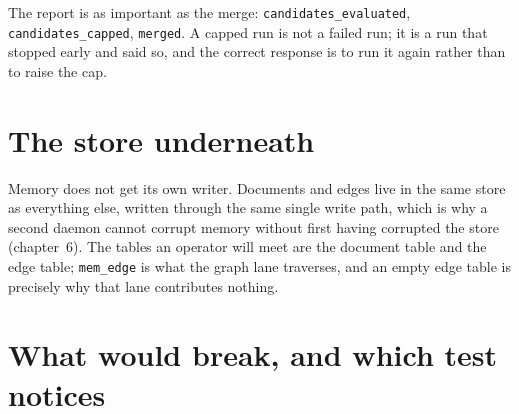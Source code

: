 The report is as important as the merge: \texttt{candidates\_evaluated}, \texttt{candidates\_capped},
\texttt{merged}. A capped run is not a failed run; it is a run that stopped early and said so, and
the correct response is to run it again rather than to raise the cap.

\section{The store underneath}

Memory does not get its own writer. Documents and edges live in the same store as everything else,
written through the same single write path, which is why a second daemon cannot corrupt memory
without first having corrupted the store (chapter~6). The tables an operator will meet are the
document table and the edge table; \texttt{mem\_edge} is what the graph lane traverses, and an
empty edge table is precisely why that lane contributes nothing.

\begin{center}
\end{center}

\section{What would break, and which test notices}

